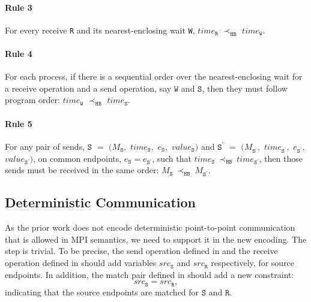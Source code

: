 \paragraph*{Rule 3} For every receive \texttt{R} and its nearest-enclosing wait \texttt{W}, $\mathit{time}_\mathtt{R}$ $\prec_\mathtt{HB}$ $\mathit{time}_\mathtt{W}$.

\paragraph*{Rule 4} For each process, if there is a sequential order over the nearest-enclosing wait for a receive operation and a send operation, say $\mathtt{W}$ and $\mathtt{S}$, then they must follow program order: $\mathit{time}_\mathtt{W}$
$\prec_\mathtt{HB}$ $\mathit{time}_\mathtt{S}$.

\paragraph*{Rule 5} For any pair of sends, $\mathtt{S}$ $=$ $(M_\mathtt{S},$ $\mathit{time}_\mathtt{S},$ $e_\mathtt{S},$ $\mathit{value}_\mathtt{S})$ and
$\mathtt{S^\prime}$ $=$ $(M_\mathtt{S^\prime},$ $\mathit{time}_\mathtt{S^\prime},$ $e_\mathtt{S^\prime},$ $\mathit{value}_\mathtt{S^\prime})$, on common endpoints, $e_{\mathtt{S}}=e_{\mathtt{S^\prime}}$,
such that
$\mathit{time}_\mathtt{S}\ \mathrm{\prec_\mathtt{HB}}\ \mathit{time}_\mathtt{S^\prime}$,
then those sends must be received in the same order:
$M_{\mathtt{S}}\ \mathrm{\prec_{\mathtt{HB}}}\ M_{\mathtt{S^\prime}}$.

\subsection{Deterministic Communication}
As the prior work does not encode deterministic point-to-point communication that is allowed in MPI semantics, we need to support it in the new encoding. The step is trivial. To be precise, the send operation defined in  and the receive operation defined in  should add variables $src_\mathtt{S}$ and $src_\mathtt{R}$ respectively, for source endpoints. In addition, the match pair defined in  should add a new constraint: 
\begin{equation*}
src_\mathtt{S} = src_\mathtt{R}, 
\end{equation*}
indicating that the source endpoints are matched for $\mathtt{S}$ and $\mathtt{R}$.

